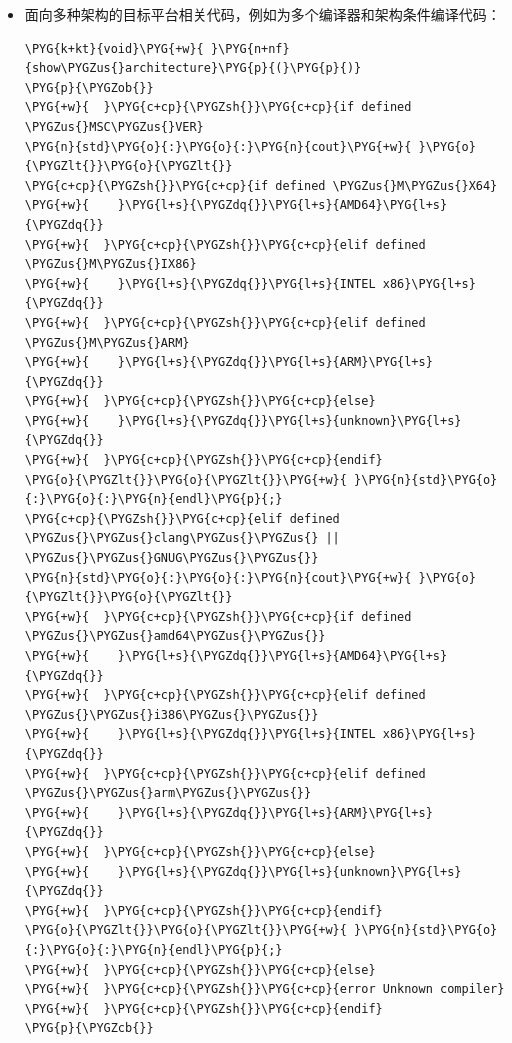 \begin{itemize}

\item 面向多种架构的目标平台相关代码，例如为多个编译器和架构条件编译代码：



\begin{codeblockbg}
\begin{Verbatim}[commandchars=\\\{\},breaklines=true,breakanywhere=true,fontsize=\codefont,xleftmargin=17bp]
\PYG{k+kt}{void}\PYG{+w}{ }\PYG{n+nf}{show\PYGZus{}architecture}\PYG{p}{(}\PYG{p}{)}
\PYG{p}{\PYGZob{}}
\PYG{+w}{  }\PYG{c+cp}{\PYGZsh{}}\PYG{c+cp}{if defined \PYGZus{}MSC\PYGZus{}VER}
\PYG{n}{std}\PYG{o}{:}\PYG{o}{:}\PYG{n}{cout}\PYG{+w}{ }\PYG{o}{\PYGZlt{}}\PYG{o}{\PYGZlt{}}
\PYG{c+cp}{\PYGZsh{}}\PYG{c+cp}{if defined \PYGZus{}M\PYGZus{}X64}
\PYG{+w}{    }\PYG{l+s}{\PYGZdq{}}\PYG{l+s}{AMD64}\PYG{l+s}{\PYGZdq{}}
\PYG{+w}{  }\PYG{c+cp}{\PYGZsh{}}\PYG{c+cp}{elif defined \PYGZus{}M\PYGZus{}IX86}
\PYG{+w}{    }\PYG{l+s}{\PYGZdq{}}\PYG{l+s}{INTEL x86}\PYG{l+s}{\PYGZdq{}}
\PYG{+w}{  }\PYG{c+cp}{\PYGZsh{}}\PYG{c+cp}{elif defined \PYGZus{}M\PYGZus{}ARM}
\PYG{+w}{    }\PYG{l+s}{\PYGZdq{}}\PYG{l+s}{ARM}\PYG{l+s}{\PYGZdq{}}
\PYG{+w}{  }\PYG{c+cp}{\PYGZsh{}}\PYG{c+cp}{else}
\PYG{+w}{    }\PYG{l+s}{\PYGZdq{}}\PYG{l+s}{unknown}\PYG{l+s}{\PYGZdq{}}
\PYG{+w}{  }\PYG{c+cp}{\PYGZsh{}}\PYG{c+cp}{endif}
\PYG{o}{\PYGZlt{}}\PYG{o}{\PYGZlt{}}\PYG{+w}{ }\PYG{n}{std}\PYG{o}{:}\PYG{o}{:}\PYG{n}{endl}\PYG{p}{;}
\PYG{c+cp}{\PYGZsh{}}\PYG{c+cp}{elif defined \PYGZus{}\PYGZus{}clang\PYGZus{}\PYGZus{} || \PYGZus{}\PYGZus{}GNUG\PYGZus{}\PYGZus{}}
\PYG{n}{std}\PYG{o}{:}\PYG{o}{:}\PYG{n}{cout}\PYG{+w}{ }\PYG{o}{\PYGZlt{}}\PYG{o}{\PYGZlt{}}
\PYG{+w}{  }\PYG{c+cp}{\PYGZsh{}}\PYG{c+cp}{if defined \PYGZus{}\PYGZus{}amd64\PYGZus{}\PYGZus{}}
\PYG{+w}{    }\PYG{l+s}{\PYGZdq{}}\PYG{l+s}{AMD64}\PYG{l+s}{\PYGZdq{}}
\PYG{+w}{  }\PYG{c+cp}{\PYGZsh{}}\PYG{c+cp}{elif defined \PYGZus{}\PYGZus{}i386\PYGZus{}\PYGZus{}}
\PYG{+w}{    }\PYG{l+s}{\PYGZdq{}}\PYG{l+s}{INTEL x86}\PYG{l+s}{\PYGZdq{}}
\PYG{+w}{  }\PYG{c+cp}{\PYGZsh{}}\PYG{c+cp}{elif defined \PYGZus{}\PYGZus{}arm\PYGZus{}\PYGZus{}}
\PYG{+w}{    }\PYG{l+s}{\PYGZdq{}}\PYG{l+s}{ARM}\PYG{l+s}{\PYGZdq{}}
\PYG{+w}{  }\PYG{c+cp}{\PYGZsh{}}\PYG{c+cp}{else}
\PYG{+w}{    }\PYG{l+s}{\PYGZdq{}}\PYG{l+s}{unknown}\PYG{l+s}{\PYGZdq{}}
\PYG{+w}{  }\PYG{c+cp}{\PYGZsh{}}\PYG{c+cp}{endif}
\PYG{o}{\PYGZlt{}}\PYG{o}{\PYGZlt{}}\PYG{+w}{ }\PYG{n}{std}\PYG{o}{:}\PYG{o}{:}\PYG{n}{endl}\PYG{p}{;}
\PYG{+w}{  }\PYG{c+cp}{\PYGZsh{}}\PYG{c+cp}{else}
\PYG{+w}{  }\PYG{c+cp}{\PYGZsh{}}\PYG{c+cp}{error Unknown compiler}
\PYG{+w}{  }\PYG{c+cp}{\PYGZsh{}}\PYG{c+cp}{endif}
\PYG{p}{\PYGZcb{}}
\end{Verbatim}
\end{codeblockbg}



\end{itemize}
